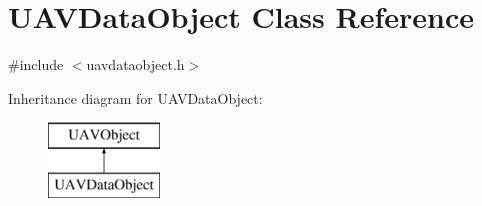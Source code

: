 \hypertarget{class_u_a_v_data_object}{\section{\-U\-A\-V\-Data\-Object \-Class \-Reference}
\label{class_u_a_v_data_object}
}


{\ttfamily \#include $<$uavdataobject.\-h$>$}

\-Inheritance diagram for \-U\-A\-V\-Data\-Object\-:\begin{figure}[H]
\begin{center}
\leavevmode
\includegraphics[height=2.000000cm]{class_u_a_v_data_object}
\end{center}
\end{figure}
